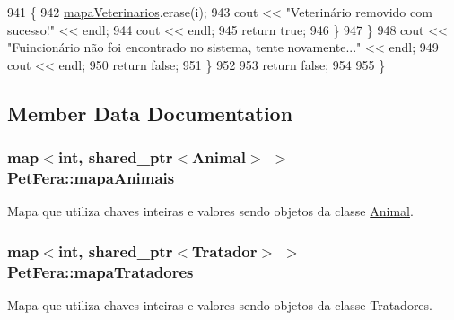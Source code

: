 \begin{DoxyCode}
941             \{
942                 \hyperlink{classPetFera_a2bed2112a627bbdb3c0338654330a1ab}{mapaVeterinarios}.erase(i);
943                 cout << \textcolor{stringliteral}{"Veterinário removido com sucesso!"} << endl;
944                 cout << endl;
945                 \textcolor{keywordflow}{return} \textcolor{keyword}{true};
946             \}
947         \}
948         cout << \textcolor{stringliteral}{"Fuincionário não foi encontrado no sistema, tente novamente..."} << endl;
949         cout << endl;
950         \textcolor{keywordflow}{return} \textcolor{keyword}{false};
951     \}
952 
953     \textcolor{keywordflow}{return} \textcolor{keyword}{false};
954     
955 \}
\end{DoxyCode}


\subsection{Member Data Documentation}
\subsubsection[{\texorpdfstring{mapa\+Animais}{mapaAnimais}}]{\setlength{\rightskip}{0pt plus 5cm}map$<$int, shared\+\_\+ptr$<${\bf Animal}$>$ $>$ Pet\+Fera\+::mapa\+Animais\hspace{0.3cm}{\ttfamily [protected]}}\hypertarget{classPetFera_ab0ba5fe6332bcffdabb7b03001280697}{}\label{classPetFera_ab0ba5fe6332bcffdabb7b03001280697}


Mapa que utiliza chaves inteiras e valores sendo objetos da classe \hyperlink{classAnimal}{Animal}. 

\subsubsection[{\texorpdfstring{mapa\+Tratadores}{mapaTratadores}}]{\setlength{\rightskip}{0pt plus 5cm}map$<$int, shared\+\_\+ptr$<${\bf Tratador}$>$ $>$ Pet\+Fera\+::mapa\+Tratadores\hspace{0.3cm}{\ttfamily [protected]}}\hypertarget{classPetFera_ac85920fc6c1471743838e6fe4444304d}{}\label{classPetFera_ac85920fc6c1471743838e6fe4444304d}


Mapa que utiliza chaves inteiras e valores sendo objetos da classe Tratadores. 

